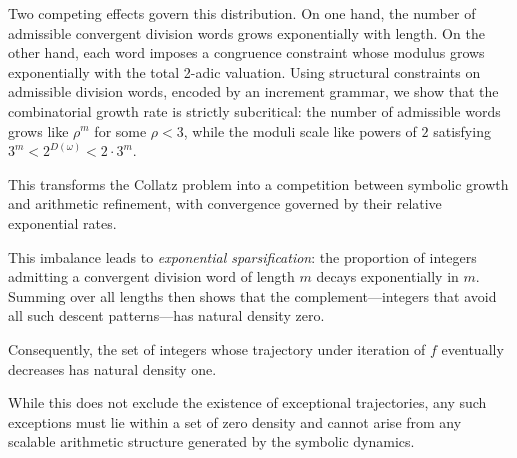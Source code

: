 \documentclass[12pt, oneside]{article}
\numberwithin{equation}{section}
\theoremstyle{definition}
\theoremstyle{plain}
\theoremstyle{remark}
\begin{document}
Two competing effects govern this distribution. On one hand, the number of admissible
convergent division words grows exponentially with length. On the other hand, each word
imposes a congruence constraint whose modulus grows exponentially with the total 2-adic
valuation. Using structural constraints on admissible division words, encoded by an
increment grammar, we show that the combinatorial growth rate is strictly subcritical:
the number of admissible words grows like $\rho^m$ for some $\rho < 3$, while the moduli
scale like powers of $2$ satisfying $3^m < 2^{D(\omega)} < 2\cdot 3^m$.

This transforms the Collatz problem into a competition between symbolic growth and
arithmetic refinement, with convergence governed by their relative exponential rates.

This imbalance leads to \emph{exponential sparsification}: the proportion of integers
admitting a convergent division word of length $m$ decays exponentially in $m$.
Summing over all lengths then shows that the complement—integers that avoid all such
descent patterns—has natural density zero.

Consequently, the set of integers whose trajectory under iteration of $f$ eventually
decreases has natural density one.

While this does not exclude the existence of exceptional trajectories, any such
exceptions must lie within a set of zero density and cannot arise from any scalable
arithmetic structure generated by the symbolic dynamics.

\end{document}
